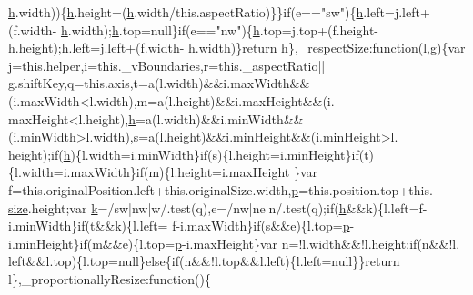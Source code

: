 \begin{DoxyCode}
      \hyperlink{all__1a_8js_aebecdaf2444e2be39f4804412d6a3bf8}{h}.width))\{\hyperlink{all__1a_8js_aebecdaf2444e2be39f4804412d6a3bf8}{h}.height=(\hyperlink{all__1a_8js_aebecdaf2444e2be39f4804412d6a3bf8}{h}.width/this.aspectRatio)\}\}\textcolor{keywordflow}{if}(e==\textcolor{stringliteral}{"sw"})\{\hyperlink{all__1a_8js_aebecdaf2444e2be39f4804412d6a3bf8}{h}.left=j.left+(f.width-
      \hyperlink{all__1a_8js_aebecdaf2444e2be39f4804412d6a3bf8}{h}.width);\hyperlink{all__1a_8js_aebecdaf2444e2be39f4804412d6a3bf8}{h}.top=null\}\textcolor{keywordflow}{if}(e==\textcolor{stringliteral}{"nw"})\{\hyperlink{all__1a_8js_aebecdaf2444e2be39f4804412d6a3bf8}{h}.top=j.top+(f.height-\hyperlink{all__1a_8js_aebecdaf2444e2be39f4804412d6a3bf8}{h}.height);\hyperlink{all__1a_8js_aebecdaf2444e2be39f4804412d6a3bf8}{h}.left=j.left+(f.width-
      \hyperlink{all__1a_8js_aebecdaf2444e2be39f4804412d6a3bf8}{h}.width)\}\textcolor{keywordflow}{return} \hyperlink{all__1a_8js_aebecdaf2444e2be39f4804412d6a3bf8}{h}\},\_respectSize:\textcolor{keyword}{function}(l,g)\{var j=this.helper,i=this.\_vBoundaries,r=this.\_aspectRatio||
      g.shiftKey,q=this.axis,t=a(l.width)&&i.maxWidth&&(i.maxWidth<l.width),m=a(l.height)&&i.maxHeight&&(i.
      maxHeight<l.height),\hyperlink{all__1a_8js_aebecdaf2444e2be39f4804412d6a3bf8}{h}=a(l.width)&&i.minWidth&&(i.minWidth>l.width),s=a(l.height)&&i.minHeight&&(i.minHeight>l.
      height);\textcolor{keywordflow}{if}(\hyperlink{all__1a_8js_aebecdaf2444e2be39f4804412d6a3bf8}{h})\{l.width=i.minWidth\}\textcolor{keywordflow}{if}(s)\{l.height=i.minHeight\}\textcolor{keywordflow}{if}(t)\{l.width=i.maxWidth\}\textcolor{keywordflow}{if}(m)\{l.height=i.maxHeight
      \}var f=this.originalPosition.left+this.originalSize.width,\hyperlink{jquery_8js_a2335e57f79b6acfb6de59c235dc8a83e}{p}=this.position.top+this.
      \hyperlink{all__15_8js_acbd9773931ec61196e11d59d52b43cb3}{size}.height;var \hyperlink{jquery_8js_ab26645c014aa005ecedef329ecf58c99}{k}=/sw|nw|w/.test(q),e=/nw|ne|n/.test(q);\textcolor{keywordflow}{if}(\hyperlink{all__1a_8js_aebecdaf2444e2be39f4804412d6a3bf8}{h}&&k)\{l.left=f-i.minWidth\}\textcolor{keywordflow}{if}(t&&k)\{l.left=
      f-i.maxWidth\}\textcolor{keywordflow}{if}(s&&e)\{l.top=\hyperlink{jquery_8js_a2335e57f79b6acfb6de59c235dc8a83e}{p}-i.minHeight\}\textcolor{keywordflow}{if}(m&&e)\{l.top=\hyperlink{jquery_8js_a2335e57f79b6acfb6de59c235dc8a83e}{p}-i.maxHeight\}var n=!l.width&&!l.height;\textcolor{keywordflow}{if}(n&&!l.
      left&&l.top)\{l.top=null\}\textcolor{keywordflow}{else}\{\textcolor{keywordflow}{if}(n&&!l.top&&l.left)\{l.left=null\}\}\textcolor{keywordflow}{return} l\},\_proportionallyResize:\textcolor{keyword}{function}()\{

\end{DoxyCode}
